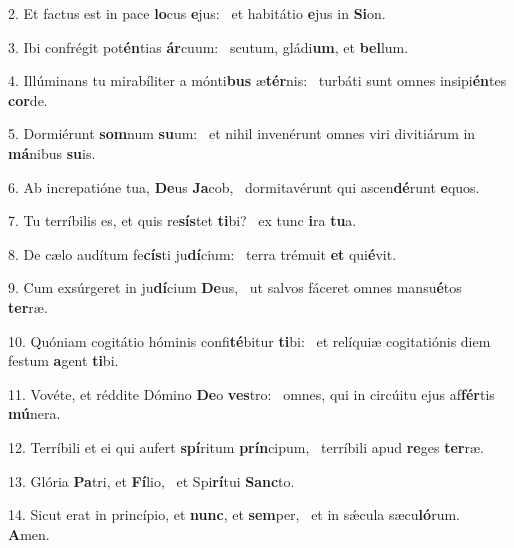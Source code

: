 2. Et factus est in pace \textbf{lo}cus \textbf{e}jus: \ast\  et habitátio \textbf{e}jus in \textbf{Si}on.\

3. Ibi confrégit pot\textbf{én}tias \textbf{ár}cuum: \ast\  scutum, gládi\textbf{um}, et \textbf{bel}lum.\

4. Illúminans tu mirabíliter a mónti\textbf{bus} æ\textbf{tér}nis: \ast\  turbáti sunt omnes insipi\textbf{én}tes \textbf{cor}de.\

5. Dormiérunt \textbf{som}num \textbf{su}um: \ast\  et nihil invenérunt omnes viri divitiárum in \textbf{má}nibus \textbf{su}is.\

6. Ab increpatióne tua, \textbf{De}us \textbf{Ja}cob, \ast\  dormitavérunt qui ascen\textbf{dé}runt \textbf{e}quos.\

7. Tu terríbilis es, et quis re\textbf{sís}tet \textbf{ti}bi? \ast\  ex tunc \textbf{i}ra \textbf{tu}a.\

8. De cælo audítum fe\textbf{cís}ti ju\textbf{dí}cium: \ast\  terra trémuit \textbf{et} qui\textbf{é}vit.\

9. Cum exsúrgeret in ju\textbf{dí}cium \textbf{De}us, \ast\  ut salvos fáceret omnes mansu\textbf{é}tos \textbf{ter}ræ.\

10. Quóniam cogitátio hóminis confi\textbf{té}bitur \textbf{ti}bi: \ast\  et relíquiæ cogitatiónis diem festum \textbf{a}gent \textbf{ti}bi.\

11. Vovéte, et réddite Dómino \textbf{De}o \textbf{ves}tro: \ast\  omnes, qui in circúitu ejus af\textbf{fér}tis \textbf{mú}nera.\

12. Terríbili et ei qui aufert \textbf{spí}ritum \textbf{prín}cipum, \ast\  terríbili apud \textbf{re}ges \textbf{ter}ræ.\

13. Glória \textbf{Pa}tri, et \textbf{Fí}lio, \ast\  et Spi\textbf{rí}tui \textbf{Sanc}to.\

14. Sicut erat in princípio, et \textbf{nunc}, et \textbf{sem}per, \ast\  et in sǽcula sæcu\textbf{ló}rum. \textbf{A}men.\

